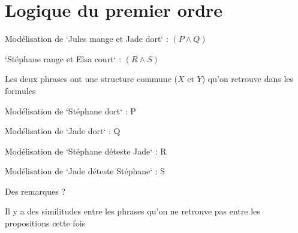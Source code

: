 \section{Logique du premier ordre}


\begin{frame}
	
Modélisation de `Jules mange et Jade dort` : $(P \wedge Q)$\newline

`Stéphane range et Elsa court` : $(R \wedge S)$\newline\pause

Les deux phrases ont une structure commune ($X$ et $Y$) qu'on retrouve dans les formules\newline


\end{frame}

\begin{frame}
	
Modélisation de `Stéphane dort` : P\newline

Modélisation de `Jade dort` : Q\newline\pause

Modélisation de `Stéphane déteste Jade` : R\newline

Modélisation de `Jade déteste Stéphane` : S\newline\pause

Des remarques ? \pause\newline

Il y a des similitudes entre les phrases qu'on ne retrouve pas entre les propositions cette fois

\end{frame}


